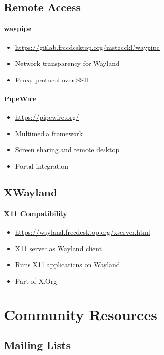 \subsection{Remote Access}

\paragraph{waypipe}
\begin{itemize}
    \item \url{https://gitlab.freedesktop.org/mstoeckl/waypipe}
    \item Network transparency for Wayland
    \item Proxy protocol over SSH
\end{itemize}

\paragraph{PipeWire}
\begin{itemize}
    \item \url{https://pipewire.org/}
    \item Multimedia framework
    \item Screen sharing and remote desktop
    \item Portal integration
\end{itemize}

\subsection{XWayland}

\paragraph{X11 Compatibility}
\begin{itemize}
    \item \url{https://wayland.freedesktop.org/xserver.html}
    \item X11 server as Wayland client
    \item Runs X11 applications on Wayland
    \item Part of X.Org
\end{itemize}

\section{Community Resources}

\subsection{Mailing Lists}

